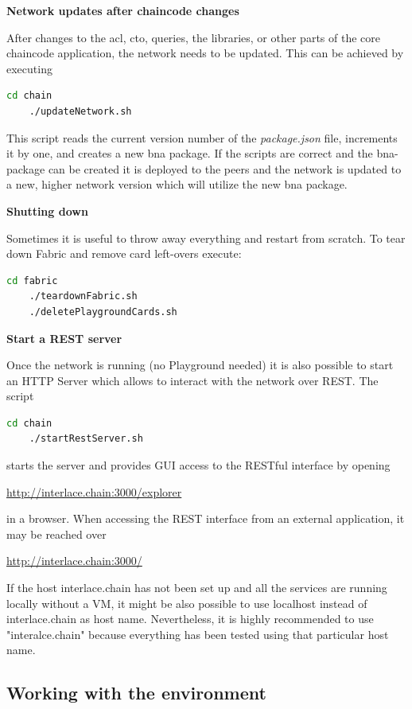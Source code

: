 \textbf{Network updates after chaincode changes}

After changes to the acl, cto, queries, the libraries, or other parts of the core chaincode application, the network needs to be updated. This can be achieved by executing

\begin{lstlisting}[language=bash]
	cd chain
	./updateNetwork.sh
\end{lstlisting}

This script reads the current version number of the \textit{package.json} file, increments it by one, and creates a new bna package. If the scripts are correct and the bna-package can be created it is deployed to the peers and the network is updated to a new, higher network version which will utilize the new bna package.

\textbf{Shutting down}

Sometimes it is useful to throw away everything and restart from scratch. To tear down Fabric and remove card left-overs execute:

\begin{lstlisting}[language=bash]
	cd fabric
	./teardownFabric.sh
	./deletePlaygroundCards.sh
\end{lstlisting}

\textbf{Start a REST server}

Once the network is running (no Playground needed) it is also possible to start an HTTP Server which allows to interact with the network over REST. The script

\begin{lstlisting}[language=bash]
	cd chain
	./startRestServer.sh
\end{lstlisting}

starts the server and provides GUI access to the RESTful interface by opening

\url{http://interlace.chain:3000/explorer}

in a browser. When accessing the REST interface from an external application, it may be reached over

\url{http://interlace.chain:3000/}

If the host interlace.chain has not been set up and all the services are running locally without a VM, it might be also possible to use localhost instead of interlace.chain as host name. Nevertheless, it is highly recommended to use "interalce.chain" because everything has been tested using that particular host name.

\subsection{Working with the environment}

